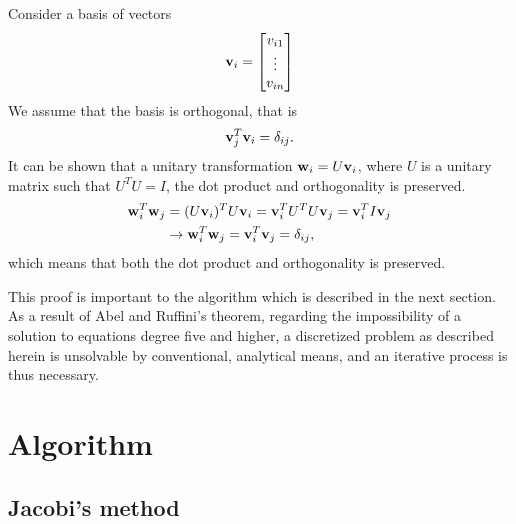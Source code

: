 \documentclass[10pt, a4paper]{amsart}
\begin{document}
Consider a basis of vectors 
\begin{equation}
\vb{v}_i = \begin{bmatrix}
v_{i1} \\
\vdots \\
v_{in}
\end{bmatrix}
\end{equation}
We assume that the basis is orthogonal, that is
\begin{equation}
\vb{v}_j^T\vb{v}_i=\delta_{ij}.
\end{equation}
It can be shown that a unitary transformation $\vb{w}_i = U\vb{v}_i$, where $U$ is a unitary matrix such that $U^TU=I$, the dot product and orthogonality is preserved. 
\begin{align}
\vb{w}_i^T\vb{w}_j &= (U\vb{v}_i)^T  U\vb{v}_i= \vb{v}_i^TU^T U\vb{v}_j = \vb{v}_i^T I \vb{v}_j \nonumber \\
&\rightarrow \vb{w}_i^T\vb{w}_j = \vb{v}_i^T\vb{v}_j = \delta_{ij},
\end{align}
which means that both the dot product and orthogonality is preserved.

This proof is important to the algorithm which is described in the next section. As a result of Abel and Ruffini's theorem, regarding the impossibility of a solution to equations degree five and higher, a discretized problem as described herein is unsolvable by conventional, analytical means, and an iterative process is thus necessary.

\section{Algorithm}

\subsection{Jacobi's method}
\end{document}

